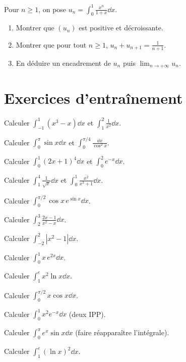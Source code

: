 \exo{} Pour $n\ge1$, on pose $\displaystyle u_n=\int_0^1\frac{x^n}{1+x}\dd x$.
\begin{enumerate}[label=\arabic*)]
\item Montrer que $(u_n)$ est positive et décroissante.
\item Montrer que pour tout $n\ge1$, $\displaystyle u_n+u_{n+1}=\frac1{n+1}$.
\item En déduire un encadrement de $u_n$ puis $\displaystyle\lim_{n\to+\infty}u_n$.
\end{enumerate}

\section{Exercices d'entraînement}

\exo{} Calculer $\displaystyle\int_{-1}^{1}(x^3-x)\dd x$ et $\displaystyle\int_1^2\frac{1}{x^2}\dd x$.

\exo{} Calculer $\displaystyle\int_0^{\pi}\sin x\dd x$ et $\displaystyle\int_0^{\pi/4}\frac{\dd x}{\cos^2 x}$.

\exo{} Calculer $\displaystyle\int_0^1(2x+1)^4\dd x$ et $\displaystyle\int_0^2 e^{-x}\dd x$.

\exo{} Calculer $\displaystyle\int_1^4\frac{1}{\sqrt x}\dd x$ et $\displaystyle\int_0^1\frac{x^2}{x^3+1}\dd x$.

\exo{} Calculer $\displaystyle\int_0^{\pi/2}\cos x\,e^{\sin x}\dd x$.

\exo{} Calculer $\displaystyle\int_2^3\frac{2x-1}{x^2-x}\dd x$.

\exo{} Calculer $\displaystyle\int_{-2}^{2}|x^2-1|\dd x$.

\exo{} Calculer $\displaystyle\int_0^1 x\,e^{2x}\dd x$.

\exo{} Calculer $\displaystyle\int_1^e x^2\ln x\dd x$.

\exo{} Calculer $\displaystyle\int_0^{\pi/2} x\cos x\dd x$.

\exo{} Calculer $\displaystyle\int_0^1 x^2 e^{-x}\dd x$ (deux IPP).

\exo{} Calculer $\displaystyle\int_0^{\pi} e^{x}\sin x\dd x$ (faire réapparaître l'intégrale).

\exo{} Calculer $\displaystyle\int_1^e (\ln x)^2\dd x$.

